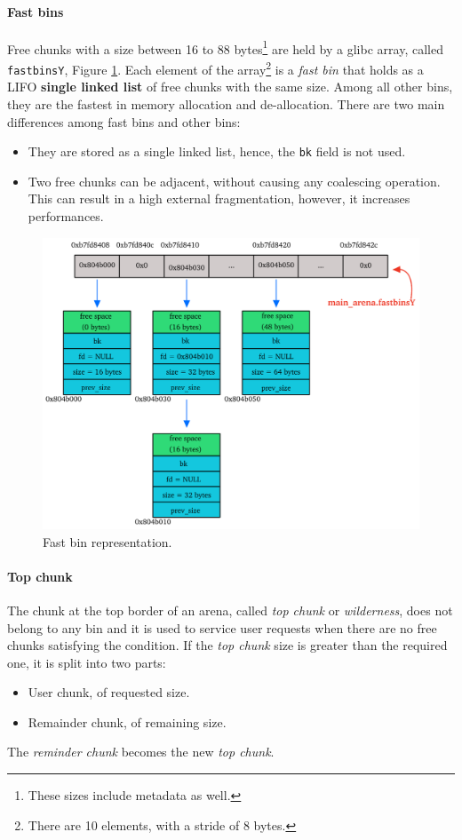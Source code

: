 \documentclass{article}
\numberwithin{equation}{subsection}
\begin{document}
\paragraph{Fast bins}
Free chunks with a size between 16 to 88 bytes\footnote{These sizes include metadata as well.} are held by a glibc array, called \texttt{fastbinsY}, Figure \ref{fig:fastbinY}. Each element of the array\footnote{There are 10 elements, with a stride of 8 bytes.} is a \emph{fast bin} that holds as a LIFO \textbf{single linked list} of free chunks with the same size. Among all other bins, they are the fastest in memory allocation and de-allocation. There are two main differences among fast bins and other bins:
\begin{itemize}
    \item They are stored as a single linked list, hence, the \texttt{bk} field is not used.
    \item Two free chunks can be adjacent, without causing any coalescing operation. This can result in a high external fragmentation, however, it increases performances.
\end{itemize}

\begin{figure}[htb]
    \centering
    \includegraphics[width=\textwidth]{main_arena_fastbinY.pdf}
    \caption{Fast bin representation.}
    \label{fig:fastbinY}
\end{figure}
\paragraph{Top chunk}
The chunk at the top border of an arena, called \emph{top chunk} or \emph{wilderness}, does not belong to any bin and it is used to service user requests when there are no free chunks satisfying the condition. If the \emph{top chunk} size is greater than the required one, it is split into two parts:
\begin{itemize}
    \item User chunk, of requested size.
    \item Remainder chunk, of remaining size.
\end{itemize}
The \emph{reminder chunk} becomes the new \emph{top chunk}.
\end{document}
